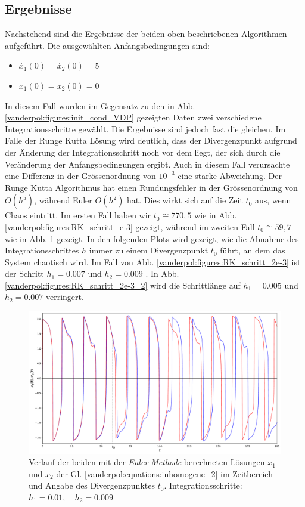 \subsection{Ergebnisse
\label{vanderpol:section:ergebnisse}}
Nachstehend sind die Ergebnisse der beiden oben beschriebenen Algorithmen aufgeführt. Die ausgewählten Anfangsbedingungen sind:
\begin{itemize}
\item
$\dot{x_1}(0) = \dot{x_2}(0) = 5$
\item
$x_1(0) = x_2(0) = 0$
\end{itemize}
In diesem Fall wurden im Gegensatz zu den in Abb.\ref{vanderpol:figures:init_cond_VDP} gezeigten Daten zwei verschiedene Integrationsschritte gewählt. Die Ergebnisse sind jedoch fast die gleichen. Im Falle der Runge Kutta Lösung wird deutlich, dass der Divergenzpunkt aufgrund der Änderung der Integrationsschritt noch vor dem liegt, der sich durch die Veränderung der Anfangsbedingungen ergibt. Auch in diesem Fall verursachte eine Differenz in der Grössenordnung von $10^{-3}$ eine starke Abweichung. Der Runge Kutta Algorithmus hat einen Rundungsfehler in der Grössenordnung von $O(h^5)$, während Euler $O(h^2)$ hat. Dies wirkt sich auf die Zeit $t_0$ aus, wenn Chaos eintritt. Im ersten Fall haben wir $t_0 \cong 770,5$ wie in Abb. \ref{vanderpol:figures:RK_schritt_e-3} gezeigt, während im zweiten Fall $t_0 \cong 59,7$ wie in Abb. \ref{vanderpol:figures:EULER_schritt} gezeigt.
In den folgenden Plots wird gezeigt, wie die Abnahme des Integrationsschrittes $h$ immer zu einem Divergenzpunkt $t_0$ führt, an dem das System chaotisch wird. Im Fall von Abb. \ref{vanderpol:figures:RK_schritt_2e-3} ist der Schritt $h_1=0.007$ und $h_2=0.009$ . In Abb. \ref{vanderpol:figures:RK_schritt_2e-3_2} wird die Schrittlänge auf $h_1=0.005$ und $h_2=0.007$ verringert. 

\begin{figure}
\includegraphics[width=\textwidth]{papers/vanderpol/figures/EULER_schritt_delta_e-3.pdf}
\caption{Verlauf der beiden mit der {\em Euler Methode} berechneten Lösungen $x_1$ und $x_2$ der Gl. \ref{vanderpol:equations:inhomogene_2} im Zeitbereich und Angabe des Divergenzpunktes $t_0$. Integrationsschritte: $h_1 = 0.01, \quad h_2 = 0.009$\label{vanderpol:figures:EULER_schritt}}
\end{figure}

